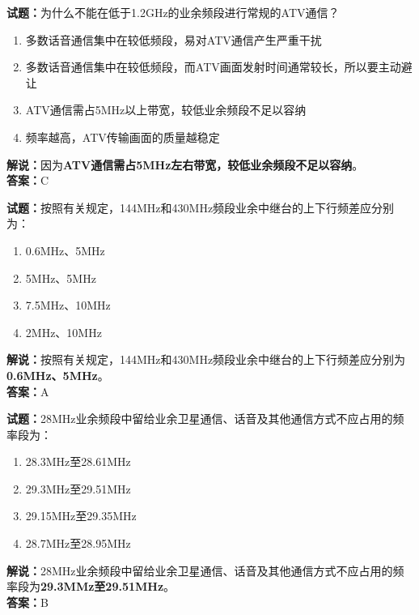 \documentclass{ctexbook}
\begin{document}
\vspace{1em}

\textbf{试题：}为什么不能在低于1.2\unit{\GHz}的业余频段进行常规的ATV通信？
\begin{enumerate}[leftmargin=3em]
  \item 多数话音通信集中在较低频段，易对ATV通信产生严重干扰
  \item 多数话音通信集中在较低频段，而ATV画面发射时间通常较长，所以要主动避让
  \item ATV通信需占5\unit{\MHz}以上带宽，较低业余频段不足以容纳
  \item 频率越高，ATV传输画面的质量越稳定
\end{enumerate}
\noindent\textbf{解说：}因为\textbf{ATV通信需占5\unit{\MHz}左右带宽，较低业余频段不足以容纳}。\\\noindent\textbf{答案：}C

\vspace{1em}

\textbf{试题：}按照有关规定，144\unit{\MHz}和430\unit{\MHz}频段业余中继台的上下行频差应分别为：
\begin{enumerate}[leftmargin=3em]
  \item 0.6\unit{\MHz}、5\unit{\MHz}%
  \item 5\unit{\MHz}、5\unit{\MHz}
  \item 7.5\unit{\MHz}、10\unit{\MHz}
  \item 2\unit{\MHz}、10\unit{\MHz}
\end{enumerate}
\noindent\textbf{解说：}按照有关规定，144\unit{\MHz}和430\unit{\MHz}频段业余中继台的上下行频差应分别为\textbf{0.6\unit{\MHz}、5\unit{\MHz}}。\\\noindent\textbf{答案：}A

\vspace{1em}

\textbf{试题：}28\unit{\MHz}业余频段中留给业余卫星通信、话音及其他通信方式不应占用的频率段为：
\begin{enumerate}[leftmargin=3em]
  \item 28.3\unit{\MHz}至28.61\unit{\MHz}
  \item 29.3\unit{\MHz}至29.51\unit{\MHz} %
  \item 29.15\unit{\MHz}至29.35\unit{\MHz}
  \item 28.7\unit{\MHz}至28.95\unit{\MHz}
\end{enumerate}
\noindent\textbf{解说：}28\unit{\MHz}业余频段中留给业余卫星通信、话音及其他通信方式不应占用的频率段为\textbf{29.3MMz至29.51\unit{\MHz}}。\\\noindent\textbf{答案：}B
\end{document}

